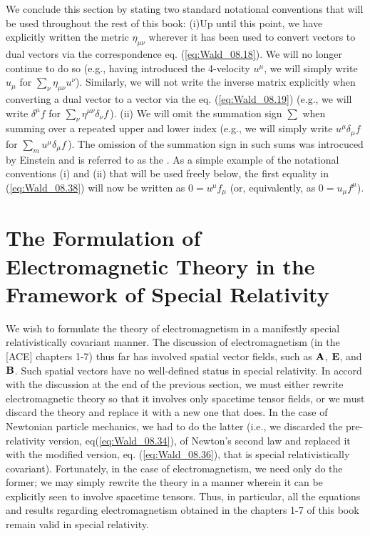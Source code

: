 We conclude this section by stating two standard notational conventions that will be used throughout the rest of this book: (i)Up until this point, we have explicitly written the metric $\eta_{\mu \nu}$ wherever it has been used to convert vectors to dual vectors via the correspondence eq. (\ref{eq:Wald_08.18}). We will no longer continue to do so (e.g., having introduced the 4-velocity $u^\mu$, we will simply write $u_\mu$ for $\sum_\nu \eta_{\mu \nu} u^\nu$). Similarly, we will not write the inverse matrix explicitly when converting a dual vector to a vector via the eq. (\ref{eq:Wald_08.19}) (e.g., we will write $\delta^\mu f$ for $\sum_\nu \eta^{\mu \nu} \delta_\nu f\,$). (ii) We will omit the summation sign $\sum$ when summing over a repeated upper and lower index (e.g., we will simply write $u^\mu \delta_\mu f$ for $\sum_m u^\mu \delta_\mu f\,$). The omission of the summation sign in such sums was introcuced by Einstein and is referred to as the . As a simple example of the notational conventions (i) and (ii) that will be used freely below, the first equality in (\ref{eq:Wald_08.38}) will now be written as $0 = u^\mu f_\mu$ (or, equivalently, as $0 = u_\mu f^\mu$). 

\section{The Formulation of Electromagnetic Theory in the Framework of Special Relativity}
\label{sec:Wald_08.2}

We wish to formulate the theory of electromagnetism in a manifestly special relativistically covariant manner. The discussion of electromagnetism (in the [ACE] chapters 1-7) thus far has involved spatial vector fields, such as $\vb{A}$, $\vb{E}$, and $\vb{B}$. Such spatial vectors have no well-defined status in special relativity. In accord with the discussion at the end of the previous section, we must either rewrite electromagnetic theory so that it involves only spacetime tensor fields, or we must discard the theory and replace it with a new one that does. In the case of Newtonian particle mechanics, 
we had to do the latter (i.e., we discarded the pre-relativity version, eq(\ref{eq:Wald_08.34}), of Newton's second law and replaced it with the modified version, eq. (\ref{eq:Wald_08.36}), that is special relativistically covariant). Fortunately, in the case of electromagnetism, we need only do the former; we may simply rewrite the theory in a manner wherein it can be explicitly seen to involve spacetime tensors. Thus, in particular, all the equations and results regarding electromagnetism obtained in the chapters 1-7 of this book remain valid in special relativity.

